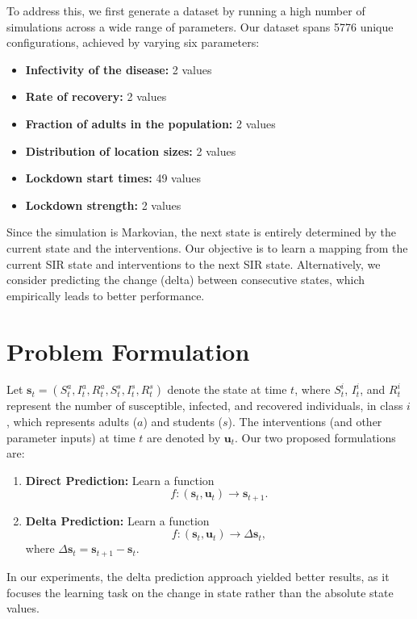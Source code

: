 \documentclass[a4paper]{article}
\begin{document}
\noindent To address this, we first generate a dataset by running a high number of simulations across a wide range of parameters. Our dataset spans 5776 unique configurations, achieved by varying six parameters:
\begin{itemize}[noitemsep]
    \item \textbf{Infectivity of the disease:} 2 values
    \item \textbf{Rate of recovery:} 2 values
    \item \textbf{Fraction of adults in the population:} 2 values
    \item \textbf{Distribution of location sizes:} 2 values
    \item \textbf{Lockdown start times:} 49 values
    \item \textbf{Lockdown strength:} 2 values
\end{itemize}

\noindent Since the simulation is Markovian, the next state is entirely determined by the current state and the interventions. Our objective is to learn a mapping from the current SIR state and interventions to the next SIR state. Alternatively, we consider predicting the change (delta) between consecutive states, which empirically leads to better performance.

\section{Problem Formulation}
Let $\mathbf{s}_t = (S^a_t, I^a_t, R^a_t, S^s_t, I^s_t, R^s_t)$ denote the state at time $t$, where $S^i_t$, $I^i_t$, and $R^i_t$ represent the number of susceptible, infected, and recovered individuals, in class $i$, which represents adults ($a$) and students ($s$). The interventions (and other parameter inputs) at time $t$ are denoted by $\mathbf{u}_t$. Our two proposed formulations are:
\begin{enumerate}[label=(\alph*)]
    \item \textbf{Direct Prediction:} Learn a function 
    \\
    \[
    f: (\mathbf{s}_t, \mathbf{u}_t) \rightarrow \mathbf{s}_{t+1}.
    \]
    \item \textbf{Delta Prediction:} Learn a function 
    \[
    f: (\mathbf{s}_t, \mathbf{u}_t) \rightarrow \Delta \mathbf{s}_t,
    \]
    where $\Delta \mathbf{s}_t = \mathbf{s}_{t+1} - \mathbf{s}_t$.
\end{enumerate}
In our experiments, the delta prediction approach yielded better results, as it focuses the learning task on the change in state rather than the absolute state values.
\end{document}
